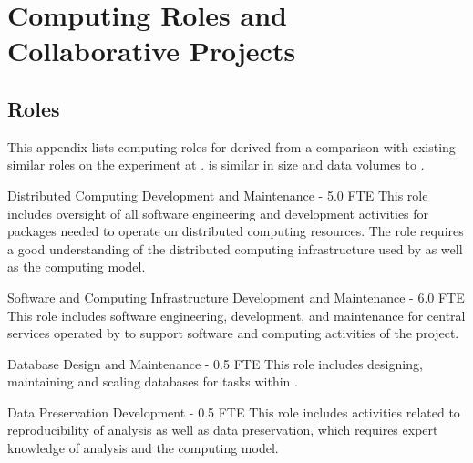 

\chapter{Computing Roles and Collaborative  Projects} 
\label{appx:es-comp}

\section{Roles}
\label{appx:comp-roles}

This appendix lists computing roles for   derived from a comparison with existing similar roles on the  experiment at .   is similar in size and data volumes to . 

\begin{description}


\item {Distributed Computing Development and Maintenance - 5.0 FTE}
This role includes oversight of all software engineering and development activities for packages needed to operate on distributed computing resources. The role requires a good understanding of the distributed computing infrastructure used by  as well as the  computing model.

\item {Software and Computing Infrastructure Development and Maintenance - 6.0 FTE}
This %
role includes software engineering, development, and maintenance for central services operated by  to support software and computing activities of the project.   %

\item {Database Design and Maintenance - 0.5 FTE}
This role includes designing, maintaining and scaling databases for %
tasks within . %

\item {Data Preservation Development - 0.5 FTE}
This role includes activities related to reproducibility of analysis as well as data preservation, which requires expert knowledge of analysis and the computing model.


\end{description}
